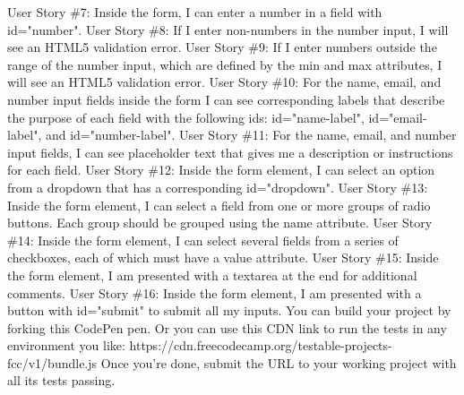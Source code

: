 \documentclass{article}%
\begin{document}
User Story \#7: Inside the form, I can enter a number in a field with id="number".\newline%
User Story \#8: If I enter non{-}numbers in the number input, I will see an HTML5 validation error.\newline%
User Story \#9: If I enter numbers outside the range of the number input, which are defined by the min and max attributes, I will see an HTML5 validation error.\newline%
User Story \#10: For the name, email, and number input fields inside the form I can see corresponding labels that describe the purpose of each field with the following ids: id="name{-}label", id="email{-}label", and id="number{-}label".\newline%
User Story \#11: For the name, email, and number input fields, I can see placeholder text that gives me a description or instructions for each field.\newline%
User Story \#12: Inside the form element, I can select an option from a dropdown that has a corresponding id="dropdown".\newline%
User Story \#13: Inside the form element, I can select a field from one or more groups of radio buttons. Each group should be grouped using the name attribute.\newline%
User Story \#14: Inside the form element, I can select several fields from a series of checkboxes, each of which must have a value attribute.\newline%
User Story \#15: Inside the form element, I am presented with a textarea at the end for additional comments.\newline%
User Story \#16: Inside the form element, I am presented with a button with id="submit" to submit all my inputs.\newline%
You can build your project by forking this CodePen pen. Or you can use this CDN link to run the tests in any environment you like: https://cdn.freecodecamp.org/testable{-}projects{-}fcc/v1/bundle.js\newline%
Once you're done, submit the URL to your working project with all its tests passing.\newline%

%
\end{document}
